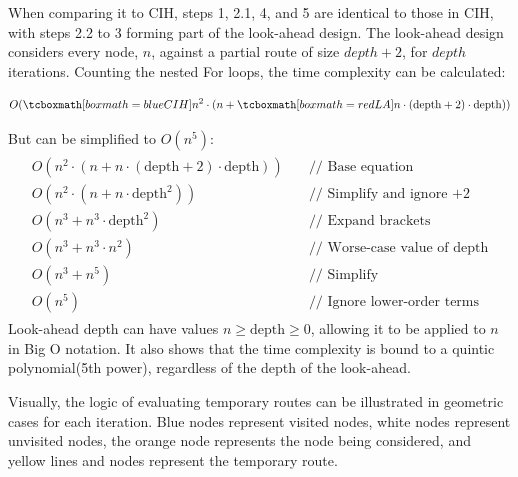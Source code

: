 When comparing it to CIH, steps 1, 2.1, 4, and 5 are identical to those in CIH, with steps 2.2 to 3 forming part of the look-ahead design. The look-ahead design considers every node, $n$, against a partial route of size $depth+2$, for $depth$ iterations. Counting the nested For loops, the time complexity can be calculated:

\begin{equation}
O(\tcboxmath[boxmath={blue}{CIH}]{n^2 \cdot (n}+\tcboxmath[boxmath={red}{LA}]{n\cdot (\text{depth}+2)\cdot \text{depth}}))
\label{equ:statictime}
\end{equation}


But can be simplified to $O(n^5)$:
\begin{gather*}
\begin{aligned}
    O(n^2 \cdot (n+n\cdot (\text{depth}+2) \cdot \text{depth})) & \quad \text{// Base equation} \\ 
    O(n^2 \cdot (n+n\cdot \text{depth}^2)) & \quad \text{// Simplify and ignore +2} \\ 
    O(n^3 + n^3\cdot \text{depth}^2) & \quad \text{// Expand brackets} \\ 
    O(n^3 + n^3\cdot n^2) & \quad \text{// Worse-case value of depth} \\
    O(n^3 +n^5) & \quad \text{// Simplify} \\ 
    O(n^5) & \quad \text{// Ignore lower-order terms}
\end{aligned}
\end{gather*}
Look-ahead depth can have values $n\geq\text{depth}\geq0$, allowing it to be applied to $n$ in Big O notation. It also shows that the time complexity is bound to a quintic polynomial(5th power), regardless of the depth of the look-ahead.

Visually, the logic of evaluating temporary routes can be illustrated in geometric cases for each iteration. Blue nodes represent visited nodes, white nodes represent unvisited nodes, the orange node represents the node being considered, and yellow lines and nodes represent the temporary route.

